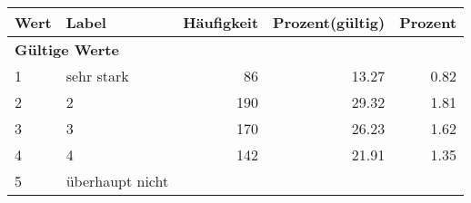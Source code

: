      \begin{longtable}{lXrrr}
     \toprule
     \textbf{Wert} & \textbf{Label} & \textbf{Häufigkeit} & \textbf{Prozent(gültig)} & \textbf{Prozent} \\
     \endhead
     \midrule
     \multicolumn{5}{l}{\textbf{Gültige Werte}}\\

     1 &
     \multicolumn{1}{X}{ sehr stark   } &


       \num{86} &
       \num[round-mode=places,round-precision=2]{13,27} &
         \num[round-mode=places,round-precision=2]{0,82} \\

     2 &
     \multicolumn{1}{X}{ 2   } &


       \num{190} &
       \num[round-mode=places,round-precision=2]{29,32} &
         \num[round-mode=places,round-precision=2]{1,81} \\

     3 &
     \multicolumn{1}{X}{ 3   } &


       \num{170} &
       \num[round-mode=places,round-precision=2]{26,23} &
         \num[round-mode=places,round-precision=2]{1,62} \\

     4 &
     \multicolumn{1}{X}{ 4   } &


       \num{142} &
       \num[round-mode=places,round-precision=2]{21,91} &
         \num[round-mode=places,round-precision=2]{1,35} \\

     5 &
     \multicolumn{1}{X}{ überhaupt nicht   } &



\end{longtable}
